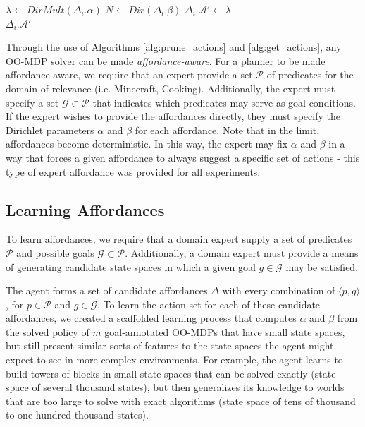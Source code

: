 \documentclass[conference]{IEEEtran}
\begin{document}
\begin{algorithm}
  \caption{$\Delta_i.getActions(s)$}
  \begin{algorithmic}[1]
    \State $\lambda \leftarrow DirMult(\Delta_i.\alpha)$
    \State $N \leftarrow Dir(\Delta_i.\beta)$
    \State $\Delta_i.\mathcal{A}' \leftarrow \lambda$
    \EndFor \\
    \Return $\Delta_i.\mathcal{A}'$
  \end{algorithmic}
  \label{alg:get_actions}
\end{algorithm}

Through the use of Algorithms \ref{alg:prune_actions} and \ref{alg:get_actions}, any OO-MDP solver can be made
{\it affordance-aware}. For a planner to be made affordance-aware, we require that an expert provide a set $\mathcal{P}$ of predicates
for the domain of relevance (i.e. Minecraft, Cooking). Additionally, the expert must specify a set
$\mathcal{G} \subset \mathcal{P}$ that indicates which predicates may serve as goal conditions. If the expert wishes
to provide the affordances directly, they must specify the Dirichlet parameters $\alpha$ and $\beta$ for each affordance. Note that
in the limit, affordances become deterministic. In this way, the expert may fix $\alpha$ and $\beta$ in a way that forces a given
affordance to always suggest a specific set of actions - this type of expert affordance was provided for all
experiments.

\subsection{Learning Affordances}

To learn affordances, we require that a domain expert supply a set of predicates
$\mathcal{P}$ and possible goals $\mathcal{G} \subset \mathcal{P}$. Additionally,
a domain expert must provide a means of generating candidate state spaces in which
a given goal $g \in \mathcal{G}$ may be satisfied.

The agent forms a set of candidate affordances $\Delta$ with every
combination of $\langle p, g \rangle$, for $p \in \mathcal{P}$ and $g
\in \mathcal{G}$.  To learn the action set for each of these candidate
affordances, we created a scaffolded learning process that computes
$\alpha$ and $\beta$ from the solved policy of $m$ goal-annotated
OO-MDPs that have small state spaces, but still present similar sorts
of features to the state spaces the agent might expect to see in more
complex environments.  For example, the agent learns to build towers
of blocks in small state spaces that can be solved exactly (state space of several thousand states), but
then generalizes its knowledge to worlds that are too large  to
solve with exact algorithms (state space of tens of thousand to one hundred thousand states).
\end{document}
